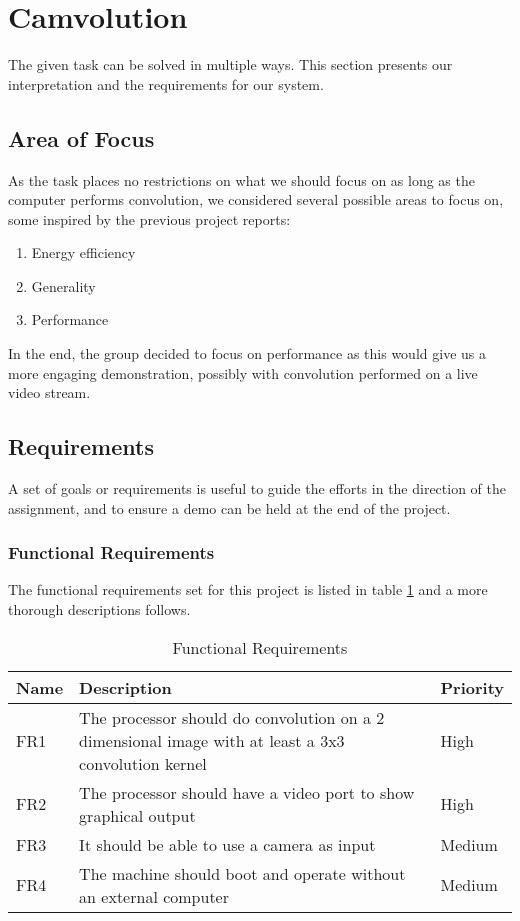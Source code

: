 \section{Camvolution}
The given task can be solved in multiple ways. This section presents our interpretation and the requirements for our system.

\subsection{Area of Focus}
As the task places no restrictions on what we should focus on as long as the computer performs convolution, we considered several possible areas to focus on, some inspired by the previous project reports:

\begin{enumerate}
    \item Energy efficiency
    \item Generality
    \item Performance
\end{enumerate}

In the end, the group decided to focus on performance as this would give us a more engaging demonstration, possibly with convolution performed on a live video stream.

\subsection{Requirements}
A set of goals or requirements is useful to guide the efforts in the direction of the assignment, and to ensure a demo can be held at the end of the project.

\subsubsection{Functional Requirements}
The functional requirements set for this project is listed in table \ref{tab:functional-requirements} and a more thorough descriptions follows.

\begin{table}[h]
    \centering
    \label{tab:functional-requirements}
    \begin{tabular}{lp{12cm}l}
        Name & Description & Priority \\
        \hline
        FR1 &
            The processor should do convolution on a 2 dimensional image with at least a 3x3 convolution kernel &
            High \\
        FR2 &
            The processor should have a video port to show graphical output &
            High \\
        FR3 &
            It should be able to use a camera as input &
            Medium \\
        FR4 &
            The machine should boot and operate without an external computer &
            Medium
    \end{tabular}
    \caption{Functional Requirements}
\end{table}


